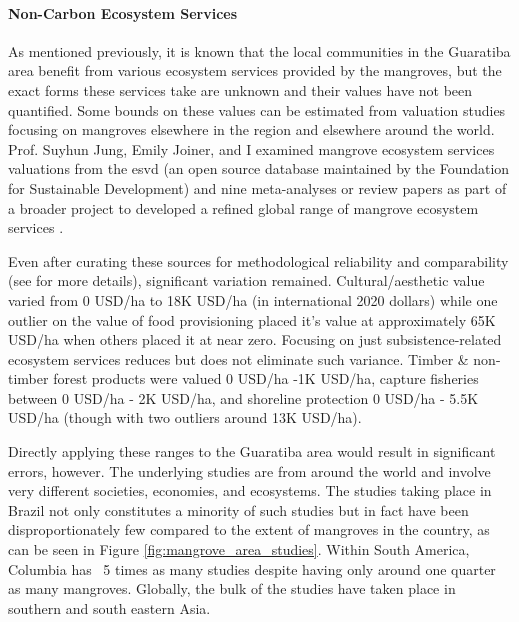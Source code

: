 \paragraph{Non-Carbon Ecosystem Services} \leavevmode\newline

As mentioned previously, it is known that the local communities in the Guaratiba area benefit from various ecosystem services provided by the mangroves, but the exact forms these services take are unknown and their values have not been quantified. Some bounds on these values can be estimated from valuation studies focusing on mangroves elsewhere in the region and elsewhere around the world. Prof. Suyhun Jung, Emily Joiner, and I examined mangrove ecosystem services valuations from the \ac{esvd} \cite{grootEcosystemServicesValuation2020} (an open source database maintained by the Foundation for Sustainable Development) and nine meta-analyses or review papers \cite{branderEmpiricsWetlandValuation2006,branderEcosystemServiceValues2012, salemEconomicValueMangroves2012, veghMangroveEcosystemServices2014, voReviewValuationMethods2012, himes-cornellMangroveEcosystemService2018, getznerEcosystemServicesMangrove2020, barbierProtectiveServiceMangrove2016, barbierEstuarineCoastalEcosystems2020} as part of a broader project to developed a refined global range of mangrove ecosystem services \cite{jungGapsMangroveForestInReview}.

Even after curating these sources for methodological reliability and comparability (see \cite{jungGapsMangroveForestInReview} for more details), significant variation remained. Cultural/aesthetic value varied from 0 USD/ha to 18K USD/ha (in international 2020 dollars) while one outlier on the value of food provisioning placed it's value at approximately 65K USD/ha when others placed it at near zero. Focusing on just subsistence-related ecosystem services reduces but does not eliminate such variance. Timber \& non-timber forest products were valued 0 USD/ha -1K USD/ha, capture fisheries between 0 USD/ha - 2K USD/ha, and shoreline protection 0 USD/ha - 5.5K USD/ha (though with two outliers around 13K USD/ha).

Directly applying these ranges to the Guaratiba area would result in significant errors, however. The underlying studies are from around the world and involve very different societies, economies, and ecosystems. The studies taking place in Brazil not only constitutes a minority of such studies but in fact have been disproportionately few compared to the extent of mangroves in the country, as can be seen in Figure \ref{fig:mangrove_area_studies}. Within South America, Columbia has ~5 times as many studies despite having only around one quarter as many mangroves. Globally, the bulk of the studies have taken place in southern and south eastern Asia. 

